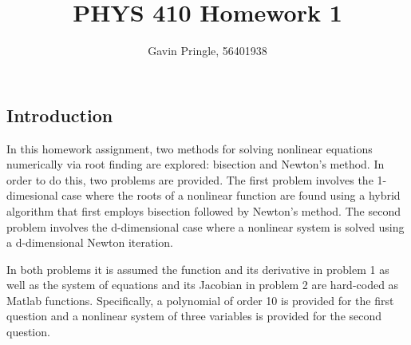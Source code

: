 \documentclass[10pt]{article}
\title{PHYS 410 Homework 1}
\author{Gavin Pringle, 56401938}
\begin{document}
\maketitle


\subsection*{Introduction}

In this homework assignment, two methods for solving nonlinear equations numerically via root finding 
are explored: bisection and Newton's method. In order to do this, two problems are provided. The first 
problem involves the 1-dimesional case where the roots of a nonlinear function are found using a hybrid 
algorithm that first employs bisection followed by Newton's method. The second problem involves the 
d-dimensional case where a nonlinear system is solved using a d-dimensional Newton iteration. 

In both problems it is assumed the function and its derivative in problem 1 as well as the system of 
equations and its Jacobian in problem 2 are hard-coded as Matlab functions. Specifically, a polynomial
of order 10 is provided for the first question and a nonlinear system of three variables is provided 
for the second question. 

\pagebreak

\end{document}
